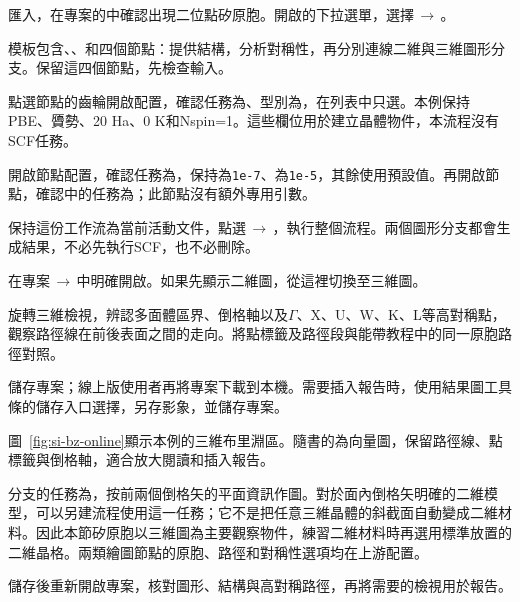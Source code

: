 \begin{steps}
\item 匯入，在專案的中確認出現二位點矽原胞。開啟的下拉選單，選擇\,$\rightarrow$\,。
\item 模板包含、、和四個節點：提供結構，分析對稱性，再分別連線二維與三維圖形分支。保留這四個節點，先檢查輸入。
\item 點選節點的齒輪開啟配置，確認任務為、型別為，在列表中只選。本例保持PBE、贗勢、20 Ha、0 K和Nspin=1。這些欄位用於建立晶體物件，本流程沒有SCF任務。
\item 開啟節點配置，確認任務為，保持為\texttt{1e-7}、為\texttt{1e-5}，其餘使用預設值。再開啟節點，確認中的任務為；此節點沒有額外專用引數。
\item 保持這份工作流為當前活動文件，點選\,$\rightarrow$\,，執行整個流程。兩個圖形分支都會生成結果，不必先執行SCF，也不必刪除。
\item 在專案\,$\rightarrow$\,中明確開啟。如果先顯示二維圖，從這裡切換至三維圖。
\item 旋轉三維檢視，辨認多面體區界、倒格軸以及$\Gamma$、X、U、W、K、L等高對稱點，觀察路徑線在前後表面之間的走向。將點標籤及路徑段與能帶教程中的同一原胞路徑對照。
\item 儲存專案；線上版使用者再將專案下載到本機。需要插入報告時，使用結果圖工具條的儲存入口選擇，另存影象，並儲存專案。
\end{steps}



圖~\ref{fig:si-bz-online}顯示本例的三維布里淵區。隨書的為向量圖，保留路徑線、點標籤與倒格軸，適合放大閱讀和插入報告。

分支的任務為，按前兩個倒格矢的平面資訊作圖。對於面內倒格矢明確的二維模型，可以另建流程使用這一任務；它不是把任意三維晶體的斜截面自動變成二維材料。因此本節矽原胞以三維圖為主要觀察物件，練習二維材料時再選用標準放置的二維晶格。兩類繪圖節點的原胞、路徑和對稱性選項均在上游配置。

儲存後重新開啟專案，核對圖形、結構與高對稱路徑，再將需要的檢視用於報告。


